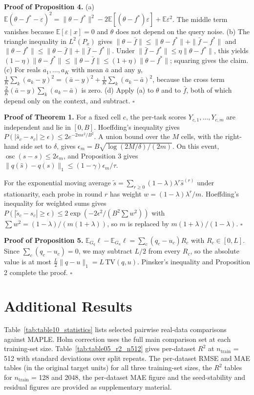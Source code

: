 \documentclass[mathematics,article,submit,pdftex,moreauthors]{Definitions/mdpi}
\begin{document}
\textbf{Proof of Proposition 4.} (a) $\mathbb{E}(\theta-f^{*}-\varepsilon)^2=\|\theta-f^{*}\|^2-2\mathbb{E}[(\theta-f^{*})\varepsilon]+\mathbb{E}\varepsilon^2$. The middle term vanishes because $\mathbb{E}[\varepsilon\mid x]=0$ and $\theta$ does not depend on the query noise. (b) The triangle inequality in $L^{2}(P_x)$ gives $\|\theta-\bar f\|\le\|\theta-f^{*}\|+\|\bar f-f^{*}\|$ and $\|\theta-f^{*}\|\le\|\theta-\bar f\|+\|\bar f-f^{*}\|$. Under $\|\bar f-f^{*}\|\le\eta\|\theta-f^{*}\|$, this yields $(1-\eta)\|\theta-f^{*}\|\le\|\theta-\bar f\|\le(1+\eta)\|\theta-f^{*}\|$; squaring gives the claim. (c) For reals $a_1,\dots,a_K$ with mean $\bar a$ and any $y$, $\frac1K\sum_k(a_k-y)^2=(\bar a-y)^2+\frac1K\sum_k(a_k-\bar a)^2$, because the cross term $\frac{2}{K}(\bar a-y)\sum_k(a_k-\bar a)$ is zero. (d) Apply (a) to $\theta$ and to $\bar f$, both of which depend only on the context, and subtract. $\square$

\textbf{Proof of Theorem 1.} For a fixed cell $c$, the per-task scores $Y_{c,1},\dots,Y_{c,m}$ are independent and lie in $[0,B]$. Hoeffding's inequality gives $P(|\hat s_c-s_c|\ge\epsilon)\le 2e^{-2m\epsilon^2/B^2}$. A union bound over the $M$ cells, with the right-hand side set to $\delta$, gives $\epsilon_m=B\sqrt{\log(2M/\delta)/(2m)}$. On this event, $\operatorname{osc}(\hat s-s)\le 2\epsilon_m$, and Proposition 3 gives $\|q(\hat s)-q(s)\|_1\le(1-\gamma)\epsilon_m/\tau$.

For the exponential moving average $\tilde s=\sum_{r\ge0}(1-\lambda)\lambda^{r}\hat s^{(r)}$ under stationarity, each probe in round $r$ has weight $w=(1-\lambda)\lambda^{r}/m$. Hoeffding's inequality for weighted sums gives $P(|\tilde s_c-s_c|\ge\epsilon)\le 2\exp(-2\epsilon^2/(B^2\sum w^2))$ with $\sum w^2=(1-\lambda)/(m(1+\lambda))$, so $m$ is replaced by $m(1+\lambda)/(1-\lambda)$. $\square$

\textbf{Proof of Proposition 5.} $\mathbb{E}_{G_q}\ell-\mathbb{E}_{G_u}\ell=\sum_c(q_c-u_c)R_c$ with $R_c\in[0,L]$. Since $\sum_c(q_c-u_c)=0$, we may subtract $L/2$ from every $R_c$, so the absolute value is at most $\frac{L}{2}\|q-u\|_1=L\,\mathrm{TV}(q,u)$. Pinsker's inequality and Proposition 2 complete the proof. $\square$

\section{Additional Results}

Table~\ref{tab:table10_statistics} lists selected pairwise real-data comparisons against MAPLE. Holm correction uses the full main comparison set at each training-set size. Table~\ref{tab:table05_r2_n512} gives per-dataset $R^2$ at $n_{\mathrm{train}}$ = 512 with standard deviations over split repeats. The per-dataset RMSE and MAE tables (in the original target units) for all three training-set sizes, the $R^2$ tables for $n_{\mathrm{train}}$ = 128 and 2048, the per-dataset MAE figure and the seed-stability and residual figures are provided as supplementary material.
\end{document}
